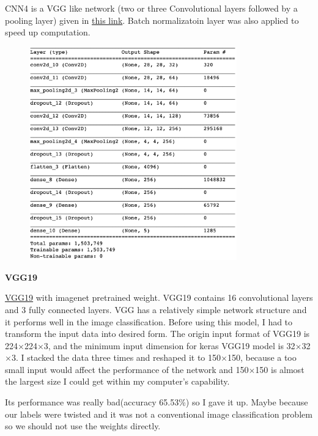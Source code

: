 \documentclass[12pt]{article}
\begin{document}
CNN4 is a VGG like network (two or three Convolutional layers followed by a pooling layer) given in \href{http://proc-x.com/2017/09/a-vgg-like-cnn-for-fashion-mnist-with-94-accuracy/}{this link}. Batch normalizatoin layer was also applied to speed up computation.
\begin{figure}[H]
\begin{center}
    \includegraphics[width=0.8\textwidth]{../plots/4.png}
\end{center}
\end{figure}
\vspace*{-1.0cm}

\textbf{VGG19}

\href{https://arxiv.org/pdf/1409.1556.pdf}{VGG19} with imagenet pretrained weight. VGG19 contains 16 convolutional layers and 3 fully connected layers. VGG has a relatively simple network structure and it performs well in the image classification. Before using this model, I had to transform the input data into desired form. The origin input format of VGG19 is 224$\times$224$\times$3, and the minimum input dimension for keras VGG19 model is 32$\times$32$\times$3. I stacked the data three times and reshaped it to 150$\times$150, because a too small input would affect the performance of the network and 150$\times$150 is almost the largest size I could get within my computer's capability.

Its performance was really bad(accuracy 65.53\%) so I gave it up. Maybe because our labels were twisted and it was not a conventional image classification problem so we should not use the weights directly. 
\end{document}
